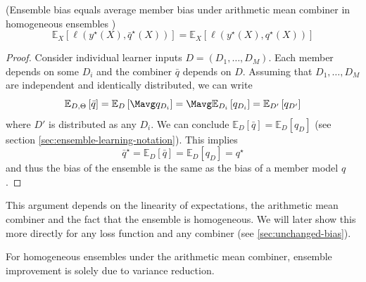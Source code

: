 \documentclass[
	twoside=false, %
]{kaobook}
\begin{document}
\begin{lemma} (Ensemble bias equals average member bias under arithmetic mean combiner in homogeneous ensembles \cite{louppe_UnderstandingRandomForests_2015})
  \label{thm:ensemble-bias-equals-average-bias}
$$
\mathbb{E}_{X}\left[ \ell(y^\star(X), \bar{q}^\star(X)) \right] 
= \mathbb{E}_{X}\left[ \ell(y^\star(X), q^\star(X)) \right] 
$$
\end{lemma}
\begin{proof}
Consider individual learner inputs $D = (D_{1}, \dots, D_{M})$. Each member depends on some $D_{i}$ and the combiner $\bar{q}$ depends on $D$. Assuming that $D_{1}, \dots, D_{M}$ are independent and identically distributed, we can write
$$
\mathbb{E}_{D, \Theta}\left[ \bar{q} \right] = \mathbb{E}_{D}\left[ \Mavg q_{D_{i}} \right] = \Mavg \mathbb{E}_{D_{i}}\left[ q_{D_{i}} \right] = \mathbb{E}_{D'}\left[ q_{D'} \right]
$$
where $D'$ is distributed as any $D_{i}$. We can conclude $\mathbb{E}_{D}\left[ \bar{q} \right] = \mathbb{E}_{D}\left[ q_{D} \right]$ (see section \ref{sec:ensemble-learning-notation}).
This implies
$$
\bar{q}^\star = \mathbb{E}_{D}\left[ \bar{q} \right]  = \mathbb{E}_{D}\left[ q_{D} \right]  = q^\star
$$
and thus the bias of the ensemble is the same as the bias of a member model $q$.
\end{proof}
This argument depends on the linearity of expectations, the arithmetic mean combiner and the fact that the ensemble is homogeneous. We will later show this more directly for any loss function and any combiner (see \ref{sec:unchanged-bias}).

\begin{corollary}
For homogeneous ensembles under the arithmetic mean combiner, ensemble improvement is solely due to variance reduction.
\end{corollary}
\end{document}
